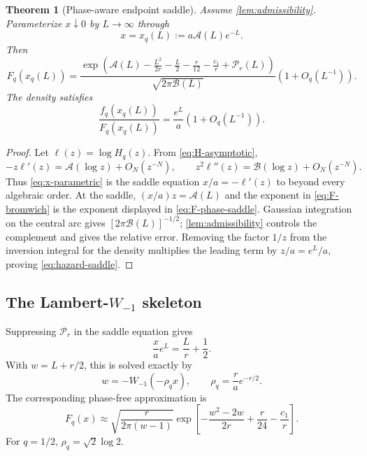 \documentclass[11pt,oneside]{article}
\newtheorem{theorem}{Theorem}[section]
\theoremstyle{definition}
\theoremstyle{remark}
\newcommand{\cP}{\mathcal P}
\newcommand{\cA}{\mathcal A}
\newcommand{\cB}{\mathcal B}
\begin{document}
\begin{theorem}[Phase-aware endpoint saddle]
\label{thm:phase-saddle}
Assume \cref{lem:admissibility}.  Parameterize $x\downarrow0$ by $L\to\infty$ through
\begin{equation}
 x=x_q(L):=a\cA(L)e^{-L}.
 \label{eq:x-parametric}
\end{equation}
Then
\begin{equation}
 \boxed{
 F_q(x_q(L))=
 \frac{\exp\!\left(
 \cA(L)-\frac{L^2}{2r}-\frac L2-\frac r{12}-\frac{c_1}{r}
 +\cP_r(L)\right)}{\sqrt{2\pi\cB(L)}}
 \left(1+O_q(L^{-1})\right).}
 \label{eq:F-phase-saddle}
\end{equation}
The density satisfies
\begin{equation}
 \frac{f_q(x_q(L))}{F_q(x_q(L))}
 =\frac{e^L}{a}\left(1+O_q(L^{-1})\right).
 \label{eq:hazard-saddle}
\end{equation}
\end{theorem}

\begin{proof}
Let $\ell(z)=\log H_q(z)$.  From \eqref{eq:H-asymptotic},
\[
 -z\ell'(z)=\cA(\log z)+O_N(z^{-N}),
 \qquad
 z^2\ell''(z)=\cB(\log z)+O_N(z^{-N}).
\]
Thus \eqref{eq:x-parametric} is the saddle equation
$x/a=-\ell'(z)$ to beyond every algebraic order.  At the saddle,
$(x/a)z=\cA(L)$ and the exponent in \eqref{eq:F-bromwich} is the exponent displayed in
\eqref{eq:F-phase-saddle}.  Gaussian integration on the central arc gives
$[2\pi\cB(L)]^{-1/2}$; \cref{lem:admissibility} controls the complement and gives the
relative error.  Removing the factor $1/z$ from the inversion integral for the density
multiplies the leading term by $z/a=e^L/a$, proving \eqref{eq:hazard-saddle}.
\end{proof}

\subsection{The Lambert-$W_{-1}$ skeleton}

Suppressing $\cP_r$ in the saddle equation gives
\[
 \frac xa e^L=\frac Lr+\frac12.
\]
With $w=L+r/2$, this is solved exactly by
\begin{equation}
 w=-W_{-1}(-\rho_qx),
 \qquad
 \rho_q=\frac r a e^{-r/2}.
 \label{eq:w-lambert}
\end{equation}
The corresponding phase-free approximation is
\begin{equation}
 F_q(x)\approx
 \sqrt{\frac r{2\pi(w-1)}}
 \exp\!\left[-\frac{w^2-2w}{2r}+\frac r{24}-\frac{c_1}{r}\right].
 \label{eq:F-lambert-skeleton}
\end{equation}
For $q=1/2$, $\rho_q=\sqrt2\log2$.
\end{document}
